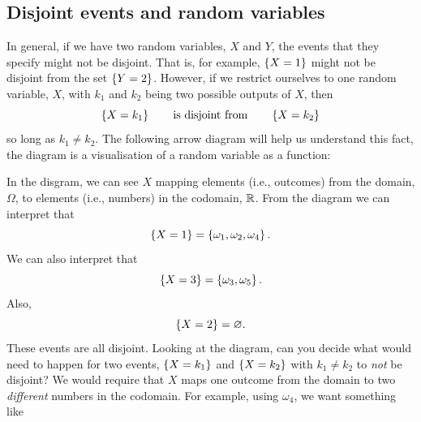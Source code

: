 \subsection{Disjoint events and random variables} \label{disjran}
In general, if we have two random variables, $X$ and $Y$, the events that they specify might not be disjoint. That is, for example, $\left\{X = 1\right\}$ might not be disjoint from the set $\left\{Y = 2\right\}$. However, if we restrict ourselves to one random variable, $X$, with $k_1$ and $k_2$ being two possible outputs of $X$, then
\[
\left\{X = k_1\right\} \qquad \text{is disjoint from} \qquad \left\{X = k_2\right\}
\] 
so long as $k_1 \neq k_2$. The following arrow diagram will help us understand this fact, the diagram is a visualisation of a random variable as a function:
\begin{center}
\end{center}
In the disgram, we can see $X$ mapping elements (i.e., outcomes) from the domain, $\Omega$, to elements (i.e., numbers) in the codomain, $\mathbb{R}$. From the diagram we can interpret that
\[
\left\{X = 1\right\} = \left\{\omega_1,\omega_2,\omega_4\right\}.
\]
We can also interpret that
\[
\left\{X = 3\right\} = \left\{\omega_3,\omega_5\right\}.
\]
Also,
\[
\left\{X = 2\right\} = \varnothing.
\]
These events are all disjoint. Looking at the diagram, can you decide what would need to happen for two events, $\left\{X = k_1\right\}$ and $\left\{X = k_2\right\}$ with $k_1 \neq k_2$ to \textit{not} be disjoint? We would require that $X$ maps one outcome from the domain to two \textit{different} numbers in the codomain. For example, using $\omega_4$, we want something like 
